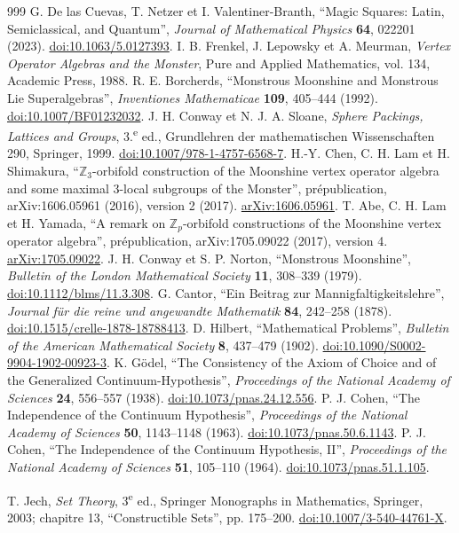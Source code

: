 \begin{thebibliography}{999}
 G. De las Cuevas, T. Netzer et I. Valentiner-Branth, ``Magic Squares: Latin, Semiclassical, and Quantum'', \emph{Journal of Mathematical Physics} \textbf{64}, 022201 (2023). \href{https://doi.org/10.1063/5.0127393}{doi:10.1063/5.0127393}.
 I. B. Frenkel, J. Lepowsky et A. Meurman, \emph{Vertex Operator Algebras and the Monster}, Pure and Applied Mathematics, vol. 134, Academic Press, 1988.
 R. E. Borcherds, ``Monstrous Moonshine and Monstrous Lie Superalgebras'', \emph{Inventiones Mathematicae} \textbf{109}, 405--444 (1992). \href{https://doi.org/10.1007/BF01232032}{doi:10.1007/BF01232032}.
 J. H. Conway et N. J. A. Sloane, \emph{Sphere Packings, Lattices and Groups}, 3.\textsuperscript{e} ed., Grundlehren der mathematischen Wissenschaften 290, Springer, 1999. \href{https://doi.org/10.1007/978-1-4757-6568-7}{doi:10.1007/978-1-4757-6568-7}.
 H.-Y. Chen, C. H. Lam et H. Shimakura, ``\(\mathbb Z_3\)-orbifold construction of the Moonshine vertex operator algebra and some maximal \(3\)-local subgroups of the Monster'', prépublication, arXiv:1606.05961 (2016), version 2 (2017). \href{https://arxiv.org/abs/1606.05961}{arXiv:1606.05961}.
 T. Abe, C. H. Lam et H. Yamada, ``A remark on \(\mathbb Z_p\)-orbifold constructions of the Moonshine vertex operator algebra'', prépublication, arXiv:1705.09022 (2017), version 4. \href{https://arxiv.org/abs/1705.09022v4}{arXiv:1705.09022}.
 J. H. Conway et S. P. Norton, ``Monstrous Moonshine'', \emph{Bulletin of the London Mathematical Society} \textbf{11}, 308--339 (1979). \href{https://doi.org/10.1112/blms/11.3.308}{doi:10.1112/blms/11.3.308}.
 G. Cantor, ``Ein Beitrag zur Mannigfaltigkeitslehre'',
\emph{Journal für die reine und angewandte Mathematik} \textbf{84},
242--258 (1878). \href{https://doi.org/10.1515/crelle-1878-18788413}{doi:10.1515/crelle-1878-18788413}.
 D. Hilbert, ``Mathematical Problems'',
\emph{Bulletin of the American Mathematical Society} \textbf{8},
437--479 (1902). \href{https://doi.org/10.1090/S0002-9904-1902-00923-3}{doi:10.1090/S0002-9904-1902-00923-3}.
 K. Gödel, ``The Consistency of the Axiom of Choice and
of the Generalized Continuum-Hypothesis'', \emph{Proceedings of the National
Academy of Sciences} \textbf{24}, 556--557 (1938).
\href{https://doi.org/10.1073/pnas.24.12.556}{doi:10.1073/pnas.24.12.556}.
 P. J. Cohen, ``The Independence of the Continuum
Hypothesis'', \emph{Proceedings of the National Academy of Sciences}
\textbf{50}, 1143--1148 (1963).
\href{https://doi.org/10.1073/pnas.50.6.1143}{doi:10.1073/pnas.50.6.1143}.
 P. J. Cohen, ``The Independence of the Continuum
Hypothesis, II'', \emph{Proceedings of the National Academy of Sciences}
\textbf{51}, 105--110 (1964).
\href{https://doi.org/10.1073/pnas.51.1.105}{doi:10.1073/pnas.51.1.105}.

 T. Jech, \emph{Set Theory}, 3\textsuperscript{e} ed.,
Springer Monographs in Mathematics, Springer, 2003; chapitre 13,
``Constructible Sets'', pp. 175--200.
\href{https://doi.org/10.1007/3-540-44761-X}{doi:10.1007/3-540-44761-X}.

\end{thebibliography}
